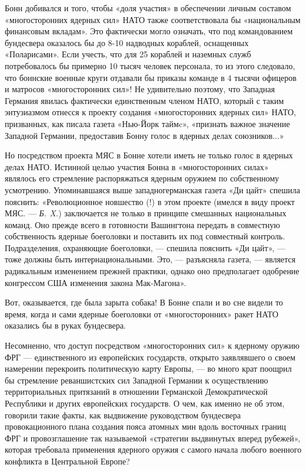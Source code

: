 \documentclass[12pt, a4paper, openany]{book}
\begin{document}
	Бонн добивался и того, чтобы «доля участия» в обеспечении личным составом «многосторонних ядерных сил» НАТО также соответствовала бы «национальным финансовым вкладам». Это фактически могло означать, что под командованием бундесвера оказалось бы до 8-10 надводных кораблей, оснащенных «Поларисами». Если учесть, что для 25 кораблей и наземных служб потребовалось бы примерно 10 тысяч человек персонала, то из этого следовало, что боннские военные круги отдавали бы приказы команде в 4 тысячи офицеров и матросов «многосторонних сил»! Не удивительно поэтому, что Западная Германия явилась фактически единственным членом НАТО, который с таким энтузиазмом отнесся к проекту создания «многосторонних ядерных сил» НАТО, призванных, как писала газета «Нью-Йорк таймc», «признать важное значение Западной Германии, предоставив Бонну голос в ядерных делах союзников...»
	
	Но посредством проекта МЯС в Бонне хотели иметь не только голос в ядерных делах НАТО. Истинной целью участия Бонна в «многосторонних силах» являлось его стремление распоряжаться ядерным оружием по собственному усмотрению. Упоминавшаяся выше западногерманская газета «Ди цайт» спешила пояснить: «Революционное новшество (!) в этом проекте (имелся в виду проект МЯС. — \textit{Б. X.}) заключается не только в принципе смешанных национальных команд. Оно прежде всего в готовности Вашингтона передать в совместную собственность ядерные боеголовки и поставить их под совместный контроль. Подразделения, охраняющие боеголовки, — спешила пояснить «Ди цайт», — тоже должны быть интернациональными. Это, — разъясняла газета, — является радикальным изменением прежней практики, однако оно предполагает одобрение конгрессом США изменения закона Мак-Магона».
	
	Вот, оказывается, где была зарыта собака! В Бонне спали и во сне видели то время, когда и сами ядерные боеголовки от «многосторонних» ракет НАТО оказались бы в руках бундесвера.
	
	Несомненно, что доступ посредством «многосторонних сил» к ядерному оружию ФРГ — единственного из европейских государств, открыто заявлявшего о своем намерении перекроить политическую карту Европы, — во много крат поощрил бы стремление реваншистских сил Западной Германии к осуществлению территориальных притязаний в отношении Германской Демократической Республики и других европейских государств. О чем, как именно не об этом, говорили такие факты, как выдвижение руководством бундесвера провокационного плана создания пояса атомных мин вдоль восточных границ ФРГ и провозглашение так называемой «стратегии выдвинутых вперед рубежей», которая требовала применения ядерного оружия с самого начала любого военного конфликта в Центральной Европе?
	
\end{document}
